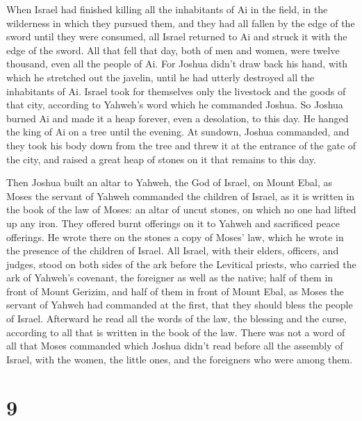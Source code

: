  When Israel had finished killing all the inhabitants of
Ai in the field, in the wilderness in which they pursued them, and they
had all fallen by the edge of the sword until they were consumed, all
Israel returned to Ai and struck it with the edge of the sword.
 All that fell that day, both of men and women, were
twelve thousand, even all the people of Ai.  For Joshua
didn't draw back his hand, with which he stretched out the javelin,
until he had utterly destroyed all the inhabitants of Ai.
 Israel took for themselves only the livestock and the
goods of that city, according to Yahweh's word which he commanded
Joshua.  So Joshua burned Ai and made it a heap forever,
even a desolation, to this day.  He hanged the king of Ai
on a tree until the evening. At sundown, Joshua commanded, and they took
his body down from the tree and threw it at the entrance of the gate of
the city, and raised a great heap of stones on it that remains to this
day.

 Then Joshua built an altar to Yahweh, the God of Israel,
on Mount Ebal,  as Moses the servant of Yahweh commanded
the children of Israel, as it is written in the book of the law of
Moses: an altar of uncut stones, on which no one had lifted up any iron.
They offered burnt offerings on it to Yahweh and sacrificed peace
offerings.  He wrote there on the stones a copy of Moses'
law, which he wrote in the presence of the children of Israel.
 All Israel, with their elders, officers, and judges,
stood on both sides of the ark before the Levitical priests, who carried
the ark of Yahweh's covenant, the foreigner as well as the native; half
of them in front of Mount Gerizim, and half of them in front of Mount
Ebal, as Moses the servant of Yahweh had commanded at the first, that
they should bless the people of Israel.  Afterward he
read all the words of the law, the blessing and the curse, according to
all that is written in the book of the law.  There was
not a word of all that Moses commanded which Joshua didn't read before
all the assembly of Israel, with the women, the little ones, and the
foreigners who were among them.

\hypertarget{section-8}{%
\section{9}\label{section-8}}

